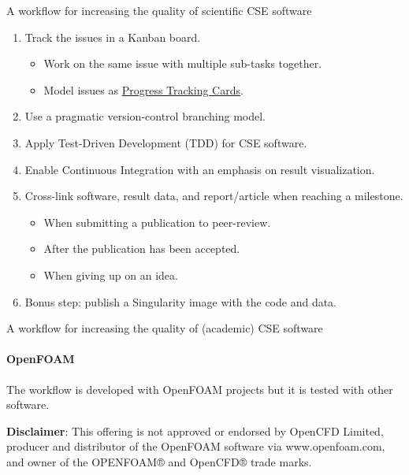 \documentclass[
	ngerman,%
	aspectratio=169,%
	color={accentcolor=2d},
	logo=true,%
	colorframetitle=true,%
	]{tudabeamer}
\begin{document}
\begin{frame}{A workflow for increasing the quality of scientific CSE software} 

    \vfill
    \begin{enumerate}
        \item Track the issues in a Kanban board. 
            \begin{itemize}
                \item Work on the same issue with multiple sub-tasks together. 
                \item Model issues as \href{https://betterscientificsoftware.github.io/PSIP-Tools/PTCs/}{Progress Tracking Cards}.
            \end{itemize}
        \item Use a pragmatic version-control branching model. 
        \item Apply Test-Driven Development (TDD) for CSE software.
        \item Enable Continuous Integration with an emphasis on result visualization. 
        \item Cross-link software, result data, and report/article when reaching a milestone.
            \begin{itemize}
                \item When submitting a publication to peer-review. 
                \item After the publication has been accepted. 
                \item When giving up on an idea. 
            \end{itemize}
        \item Bonus step: publish a Singularity image with the code and data.
    \end{enumerate}
\end{frame}

\begin{frame}{A workflow for increasing the quality of (academic) CSE software} 
    \framesubtitle{OpenFOAM}

        \vfill

        The workflow is developed with OpenFOAM projects but it is tested with other software. 

        \vspace{1cm}

        \textbf{Disclaimer}: This offering is not approved or endorsed by OpenCFD Limited, producer and distributor of the OpenFOAM software via www.openfoam.com, and owner of the OPENFOAM®  and OpenCFD®  trade marks. 

\end{frame}
\end{document}
